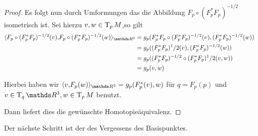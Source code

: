 \begin{Satz}
\begin{proof}
          Es folgt nun durch Umformungen das die Abbildung
          $ F_p \circ (F_p^\ast F_p)^{-1/2} $ isometrisch
          ist. Sei hierzu $ v,w \in \operatorname{T}_{p}M $,so gilt
          \begin{align*}
            \scalar{F_p \circ (F_p^\ast F_p)^{-1/2}(v)}{F_p \circ (F_p^\ast F_p)^{-1/2}(w)}_{\R^3} &=
                                                                                                                     g_p(F_p^\ast F_p \circ (F_p^\ast F_p)^{-1/2}(v),(F_p^\ast F_p)^{-1/2}(w)) \\
                                                                                                                   &= g_p((F_p^\ast F_p)^1/2(v),(F_p^\ast F_p)^{-1/2}(w)) \\
                                                                                                                   &= g_p((F_p^\ast F_p)^{-1/2} \circ (F_p^\ast F_p)^1/2(v,w)) \\
                                                                                                                   &= g_p(v,w)
		\end{align*}
		
		Hierbei haben wir $ \scalar{v}{F_p(w)}_{\R^3} = g_p(F_p^\ast(v),w) $ für $ q =F_p(p) $ und $ v \in \tang{q}{\R^3},w\in \tang{p}{M} $ 
		benutzt.
		
		Dann liefert dies die gewünschte Homotopieäquivalenz.
	
	\end{proof}
\end{Satz}

Der nächste Schritt ist der des Vergessens des Basispunktes.

